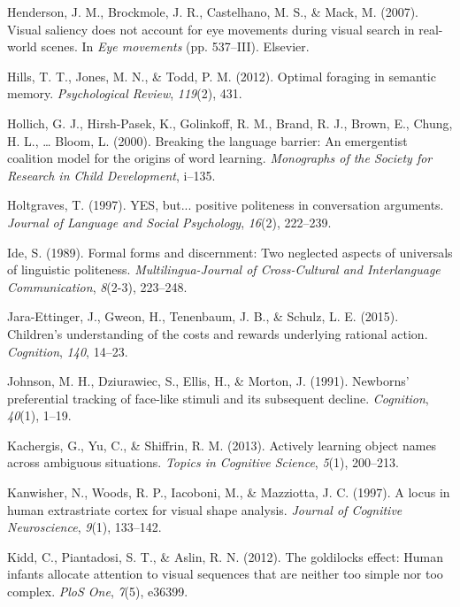 \documentclass[oneside]{report}
\begin{document}
\hypertarget{ref-henderson2007visual}{}
Henderson, J. M., Brockmole, J. R., Castelhano, M. S., \& Mack, M.
(2007). Visual saliency does not account for eye movements during visual
search in real-world scenes. In \emph{Eye movements} (pp. 537--III).
Elsevier.

\hypertarget{ref-hills2012optimal}{}
Hills, T. T., Jones, M. N., \& Todd, P. M. (2012). Optimal foraging in
semantic memory. \emph{Psychological Review}, \emph{119}(2), 431.

\hypertarget{ref-hollich2000breaking}{}
Hollich, G. J., Hirsh-Pasek, K., Golinkoff, R. M., Brand, R. J., Brown,
E., Chung, H. L., \ldots{} Bloom, L. (2000). Breaking the language
barrier: An emergentist coalition model for the origins of word
learning. \emph{Monographs of the Society for Research in Child
Development}, i--135.

\hypertarget{ref-holtgraves1997}{}
Holtgraves, T. (1997). YES, but... positive politeness in conversation
arguments. \emph{Journal of Language and Social Psychology},
\emph{16}(2), 222--239.

\hypertarget{ref-ide1989}{}
Ide, S. (1989). Formal forms and discernment: Two neglected aspects of
universals of linguistic politeness. \emph{Multilingua-Journal of
Cross-Cultural and Interlanguage Communication}, \emph{8}(2-3),
223--248.

\hypertarget{ref-jara2015children}{}
Jara-Ettinger, J., Gweon, H., Tenenbaum, J. B., \& Schulz, L. E. (2015).
Children's understanding of the costs and rewards underlying rational
action. \emph{Cognition}, \emph{140}, 14--23.

\hypertarget{ref-johnson1991newborns}{}
Johnson, M. H., Dziurawiec, S., Ellis, H., \& Morton, J. (1991).
Newborns' preferential tracking of face-like stimuli and its subsequent
decline. \emph{Cognition}, \emph{40}(1), 1--19.

\hypertarget{ref-kachergis2013actively}{}
Kachergis, G., Yu, C., \& Shiffrin, R. M. (2013). Actively learning
object names across ambiguous situations. \emph{Topics in Cognitive
Science}, \emph{5}(1), 200--213.

\hypertarget{ref-kanwisher1997locus}{}
Kanwisher, N., Woods, R. P., Iacoboni, M., \& Mazziotta, J. C. (1997). A
locus in human extrastriate cortex for visual shape analysis.
\emph{Journal of Cognitive Neuroscience}, \emph{9}(1), 133--142.

\hypertarget{ref-kidd2012goldilocks}{}
Kidd, C., Piantadosi, S. T., \& Aslin, R. N. (2012). The goldilocks
effect: Human infants allocate attention to visual sequences that are
neither too simple nor too complex. \emph{PloS One}, \emph{7}(5),
e36399.
\end{document}
